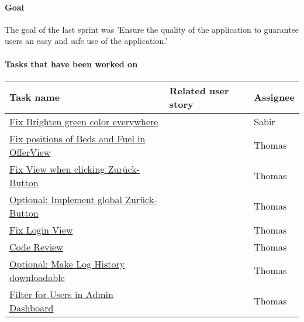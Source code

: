 \paragraph{Goal}
The goal of the last sprint was 'Ensure the quality of the application to guarantee users an easy and safe use of the 
application.'



\paragraph{Tasks that have been worked on \newline \newline}

\begin{tabular}{|p{}|p{1cm}|p{}|}
    \hline
    {Task name} & {Related user story} & Assignee \\
    \hline
    \hline
	\hline
	\href{https://gitlab.rz.uni-bamberg.de/swt/teaching/2021-ws/swt-swl-b/group-a/-/issues/134}{Fix Brighten green color everywhere} &   & Sabir \\

	\hline
	\href{https://gitlab.rz.uni-bamberg.de/swt/teaching/2021-ws/swt-swl-b/group-a/-/issues/155}{Fix positions of Beds and Fuel in OfferView} &   & Thomas \\

    \hline
	\href{https://gitlab.rz.uni-bamberg.de/swt/teaching/2021-ws/swt-swl-b/group-a/-/issues/151}{Fix View when clicking Zurück-Button} &   & Thomas \\

    \hline
	\href{https://gitlab.rz.uni-bamberg.de/swt/teaching/2021-ws/swt-swl-b/group-a/-/issues/142}{Optional: Implement global Zurück-Button} &   & Thomas \\

    \hline
	\href{https://gitlab.rz.uni-bamberg.de/swt/teaching/2021-ws/swt-swl-b/group-a/-/issues/157}{Fix Login View} &   & Thomas \\

    \hline
	\href{https://gitlab.rz.uni-bamberg.de/swt/teaching/2021-ws/swt-swl-b/group-a/-/issues/95}{Code Review} &   & Thomas \\

    \hline
	\href{https://gitlab.rz.uni-bamberg.de/swt/teaching/2021-ws/swt-swl-b/group-a/-/issues/152}{Optional: Make Log History downloadable} &   & Thomas \\

    \hline
	\href{https://gitlab.rz.uni-bamberg.de/swt/teaching/2021-ws/swt-swl-b/group-a/-/issues/153}{Filter for Users in Admin Dashboard} &   & Thomas \\


\end{tabular}
